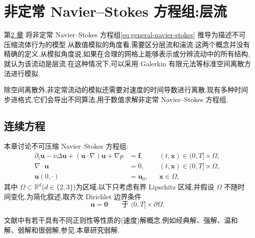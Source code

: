 \chapter{非定常 Navier--Stokes 方程组:层流}\label{chap:time-dependent-ns}

\begin{note}\label{note:time-dependent-ns-intro}
第\hyperref[chap:flow-equations]{2 章} 将非定常 Navier--Stokes 方程组\cref{eq:general-navier-stokes} 推导为描述不可压缩流体行为的模型.从数值模拟的角度看,需要区分层流和湍流.这两个概念并没有精确的定义.从模拟角度说,如果在合理的网格上能够表示或分辨流动中的所有结构,就认为该流动是层流.在这种情况下,可以采用 Galerkin 有限元法等标准空间离散方法进行模拟.

除空间离散外,非定常流动的模拟还需要对速度的时间导数进行离散.现有多种时间步进格式,它们会导出不同算法,用于数值求解非定常 Navier--Stokes 方程组.
\end{note}

\section{连续方程}\label{sec:time-dependent-ns-continuous}

\begin{note}\label{note:time-dependent-ns-equations}
本章讨论不可压缩 Navier--Stokes 方程组:
\begin{equation}\label{eq:time-dependent-ns-strong}
\begin{aligned}
  \partial_t\bm{u}-\nu\Delta\bm{u}
      +(\bm{u}\cdot\nabla)\bm{u}+\nabla p
    &=\bm{f},
      &&(t,\bm{x})\in(0,T]\times\Omega,\\
  \nabla\cdot\bm{u}&=0,
      &&(t,\bm{x})\in(0,T]\times\Omega,\\
  \bm{u}(0,\cdot)&=\bm{u}_0,
      &&\bm{x}\in\Omega,
\end{aligned}
\end{equation}
其中 $\Omega\subset\mathbb{R}^d$($d\in\{2,3\}$)为区域.以下只考虑有界 Lipschitz 区域,并假设 $\Omega$ 不随时间变化.为简化叙述,取齐次 Dirichlet 边界条件
\begin{equation}\label{eq:time-dependent-ns-dirichlet}
  \bm{u}=\bm{0}
  \qquad\text{于 }(0,T]\times\partial\Omega.
\end{equation}
\end{note}

\begin{note}[解的概念]\label{note:time-dependent-ns-solution-notions}
文献中有若干具有不同正则性等性质的(速度)解概念,例如经典解、强解、温和解、弱解和很弱解,参见\textcite{Farwig2014}.本章研究弱解.
\end{note}

